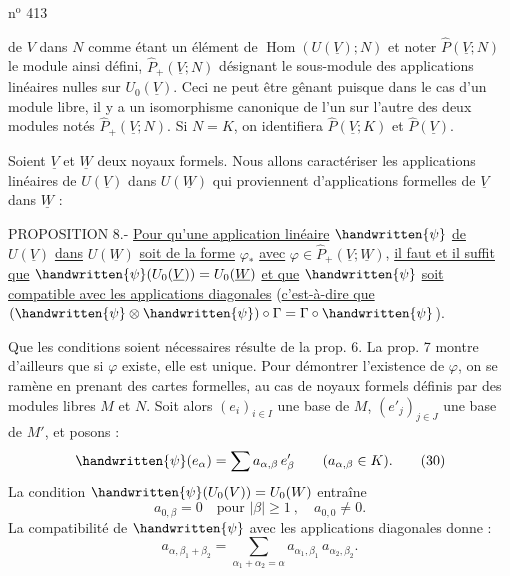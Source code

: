 \hfill n$^{\mathrm o}$ 413

de $V$ dans $N$ comme étant un élément de $\operatorname{Hom}(U(\underline V);N)$ et noter $\widehat P(\underline V;N)$ le module ainsi défini, $\widehat P_+(\underline V;N)$ désignant le sous-module des applications linéaires nulles sur $U_0(\underline V)$. Ceci ne peut être gênant puisque dans le cas d'un module libre, il y a un isomorphisme canonique de l'un sur l'autre des deux modules notés $\widehat P_+(\underline V;N)$. Si $N=K$, on identifiera $\widehat P(\underline V;K)$ et $\widehat P(\underline V)$.

Soient $\underline V$ et $\underline W$ deux noyaux formels. Nous allons caractériser les applications linéaires de $U(\underline V)$ dans $U(\underline W)$ qui proviennent d'applications formelles de $\underline V$ dans $\underline W$ :

PROPOSITION 8.- \uline{Pour qu'une application linéaire} $\handwritten{\psi}$ \uline{de} $U(\underline V)$ \uline{dans} $U(\underline W)$ \uline{soit de la forme} $\varphi_*$ \uline{avec} $\varphi\in\widehat P_+(\underline V;\underline W)$, \uline{il faut et il suffit que} $\handwritten{\psi}(U_0(\underline V))=U_0(\underline W)$ \uline{et que} $\handwritten{\psi}$ \uline{soit compatible avec les applications diagonales} (\uline{c'est-à-dire que} $(\handwritten{\psi}\otimes\handwritten{\psi})\circ\Gamma=\Gamma\circ\handwritten{\psi}$).

Que les conditions soient nécessaires résulte de la prop. 6. La prop. 7 montre d'ailleurs que si $\varphi$ existe, elle est unique. Pour démontrer l'existence de $\varphi$, on se ramène en prenant des cartes formelles, au cas de noyaux formels définis par des modules libres $M$ et $N$. Soit alors $(e_i)_{i\in I}$ une base de $M$, $(e'_j)_{j\in J}$ une base de $M'$, et posons :
\[
\handwritten{\psi}(e_\alpha)=\sum a_{\alpha,\beta}\,e'_\beta \qquad(a_{\alpha,\beta}\in K).\tag*{(30)}
\]
La condition $\handwritten{\psi}(U_0(V))=U_0(W)$ entraîne
\[
a_{0,\beta}=0\quad\text{pour }|\beta|\geq 1\ ,\quad a_{0,0}\neq 0.\tag*{(31)}
\]
La compatibilité de $\handwritten{\psi}$ avec les applications diagonales donne :
\[
a_{\alpha,\beta_1+\beta_2}=\sum_{\alpha_1+\alpha_2=\alpha}a_{\alpha_1,\beta_1}\,a_{\alpha_2,\beta_2}.\tag*{(32)}
\]
